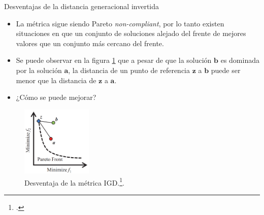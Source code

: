 \documentclass{beamer}
\begin{document}
\begin{frame}{Desventajas de la distancia generacional invertida}
\begin{itemize}
\justifying
\scriptsize
\item La métrica sigue siendo Pareto \textit{non-compliant}, por lo tanto existen situaciones en que un conjunto de soluciones alejado del frente de mejores valores que un conjunto más cercano del frente.
\item Se puede observar en la figura \ref{fig:igd_fail} que a pesar de que la solución $\boldsymbol{b}$ es dominada por la solución $\boldsymbol{a}$, la distancia de un punto de referencia $\boldsymbol{z}$ a $\boldsymbol{b}$ puede ser menor que la distancia de $\boldsymbol{z}$ a $\boldsymbol{a}$.
\item ¿Cómo se puede mejorar?
\end{itemize}
\begin{figure}[H]
\centering
\includegraphics[width=0.3\textwidth]{igd_2.png}
\caption{\scriptsize Desventaja de la métrica IGD.\footcite{ishibuchi2016sensitivity}.} \label{fig:igd_fail}
\end{figure}
\end{frame}
\end{document}
